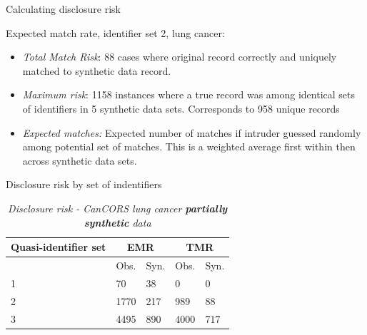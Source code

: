 \documentclass[11pt,handout]{beamer}
\begin{document}
\begin{frame}{Calculating disclosure risk}

Expected match rate, identifier set 2, lung cancer:

\begin{itemize}

  \item \textsl{Total Match Risk}: 88 cases where original record correctly and uniquely matched to synthetic data record.
  
  \item \textsl{Maximum risk}:  1158 instances where a true record was among identical sets of identifiers in 5 synthetic data sets.  Corresponds to 958 unique records
  
  \item \textsl{Expected matches:} Expected number of matches if intruder guessed randomly among potential set of matches.  This is a weighted average first within then across synthetic data sets.


\end{itemize}

\end{frame}



\begin{frame}{Disclosure risk by set of indentifiers}

\begin{table}[!h]
\caption{\emph{Disclosure risk  - CanCORS lung cancer \textbf{partially synthetic} data}}
\centering
\begin{tabular}{lllll}   
\textbf{Quasi-identifier set} & \multicolumn{2}{c}{\textbf{EMR}} & \multicolumn{2}{c}{\textbf{TMR}}  \\  \hline
  &  Obs. & Syn. &  Obs. & Syn. \\ 
1 &  70 & 38 & 0 & 0  \\ 
2 &  1770 & 217 & 989 & 88\\
3  & 4495 & 890 & 4000 & 717 \\  
\end{tabular}

\label{DiscRisk_lung}
\end{table}

\end{frame}

\end{document}
